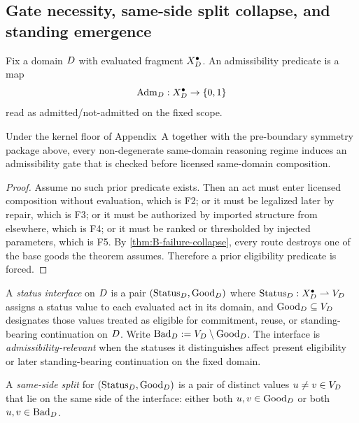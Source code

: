 \subsection{Gate necessity, same-side split collapse, and standing emergence}

\begin{definition}
Fix a domain $D$ with evaluated fragment $X_D^{\bullet}$. An admissibility predicate is a map
\[
\mathrm{Adm}_D:X_D^{\bullet}\to\{0,1\}
\]
read as admitted/not-admitted on the fixed scope.
\end{definition}

\begin{theorem}
\label{thm:B-gate-necessity}
Under the kernel floor of Appendix~A together with the pre-boundary symmetry package above, every non-degenerate same-domain reasoning regime induces an admissibility gate that is checked before licensed same-domain composition.
\end{theorem}

\begin{proof}
Assume no such prior predicate exists. Then an act must enter licensed composition without evaluation, which is F2; or it must be legalized later by repair, which is F3; or it must be authorized by imported structure from elsewhere, which is F4; or it must be ranked or thresholded by injected parameters, which is F5. By \cref{thm:B-failure-collapse}, every route destroys one of the base goods the theorem assumes. Therefore a prior eligibility predicate is forced.
\end{proof}

\begin{definition}
A \emph{status interface} on $D$ is a pair $(\mathrm{Status}_D,\mathrm{Good}_D)$ where $\mathrm{Status}_D:X_D^{\bullet}\rightharpoonup V_D$ assigns a status value to each evaluated act in its domain, and $\mathrm{Good}_D\subseteq V_D$ designates those values treated as eligible for commitment, reuse, or standing-bearing continuation on $D$. Write $\mathrm{Bad}_D:=V_D\setminus \mathrm{Good}_D$. The interface is \emph{admissibility-relevant} when the statuses it distinguishes affect present eligibility or later standing-bearing continuation on the fixed domain.
\end{definition}

\begin{definition}
A \emph{same-side split} for $(\mathrm{Status}_D,\mathrm{Good}_D)$ is a pair of distinct values $u\neq v\in V_D$ that lie on the same side of the interface: either both $u,v\in \mathrm{Good}_D$ or both $u,v\in \mathrm{Bad}_D$.
\end{definition}

